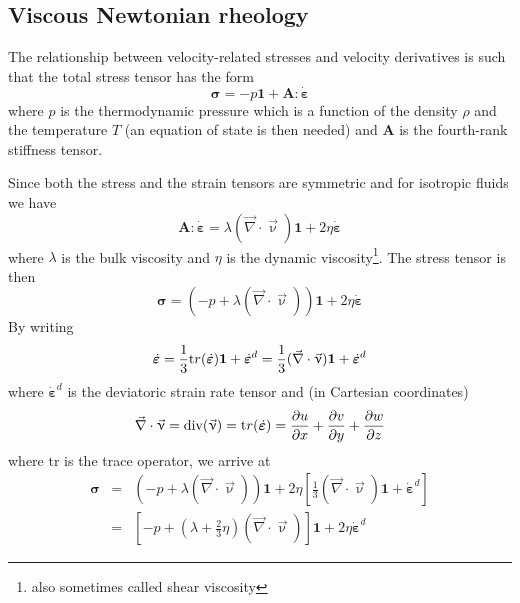 \subsection{Viscous Newtonian rheology}

The relationship between velocity-related stresses and
velocity derivatives is such that the total stress tensor has the form \cite{berc09}
\begin{equation}
{\bm \sigma} = -p {\bm 1} + {\bm A}:\dot{\bm \varepsilon}
\end{equation}
where $p$ is the thermodynamic pressure which is a function of the density $\rho$ and the temperature $T$ (an equation of state is then needed)
and ${\bm A}$ is the fourth-rank stiffness tensor.

Since both the stress and the strain tensors are symmetric and for isotropic 
fluids we have \cite{malvern}
\begin{equation}
{\bm A}:\dot{\bm \varepsilon} = \lambda (\vec\nabla\cdot\vec\upnu) {\bm 1} + 2\eta \dot{\bm \varepsilon}
\end{equation}
where $\lambda$ is the bulk viscosity and $\eta$ is the dynamic viscosity\footnote{also sometimes called shear viscosity}. 
The stress tensor is then 
\begin{equation}
{\bm \sigma} = (-p  + \lambda (\vec\nabla\cdot\vec\upnu)) {\bm 1} + 2\eta \dot{\bm \varepsilon}
\end{equation}
By writing 
\[
\dot{\bm \varepsilon} = \frac{1}{3}{\text tr}(\dot{\bm \varepsilon}) {\bm 1} + \dot{\bm \varepsilon}^d =
 \frac{1}{3}(\vec\nabla\cdot\vec\upnu) {\bm 1} + \dot{\bm \varepsilon}^d
\]
where $\dot{\bm \varepsilon}^d$ is the deviatoric strain rate tensor and 
(in Cartesian coordinates)
\begin{equation}
\vec\nabla\cdot\vec\upnu = 
\text{div} (\vec\upnu ) =
{\text tr}(\dot{\bm \varepsilon}) =
\frac{\partial u}{\partial x}+ 
\frac{\partial v}{\partial y}+ 
\frac{\partial w}{\partial z} 
\end{equation} 
where $\text{tr}$ is the trace operator, we arrive at
\begin{eqnarray}
{\bm \sigma} 
&=& (-p+\lambda(\vec\nabla\cdot\vec\upnu)) {\bm 1} + 2\eta \left[ \frac{1}{3}(\vec\nabla\cdot\vec\upnu) {\bm 1} + \dot{\bm \varepsilon}^d \right] \\
&=& \left[ -p+\left(\lambda+\frac{2}{3}\eta\right)(\vec\nabla\cdot\vec\upnu)\right] {\bm 1} + 2\eta  \dot{\bm \varepsilon}^d  
\end{eqnarray}
